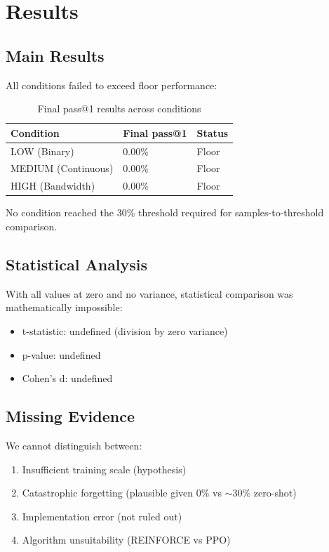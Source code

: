 \section{Results}
\label{sec:results}

\subsection{Main Results}

All conditions failed to exceed floor performance:

\begin{table}[h]
\centering
\caption{Final pass@1 results across conditions}
\label{tab:main_results}
\begin{tabular}{lll}
\toprule
Condition & Final pass@1 & Status \\
\midrule
LOW (Binary) & 0.00\% & Floor \\
MEDIUM (Continuous) & 0.00\% & Floor \\
HIGH (Bandwidth) & 0.00\% & Floor \\
\bottomrule
\end{tabular}
\end{table}

No condition reached the 30\% threshold required for samples-to-threshold comparison.

\subsection{Statistical Analysis}

With all values at zero and no variance, statistical comparison was mathematically impossible:
\begin{itemize}
    \item t-statistic: undefined (division by zero variance)
    \item p-value: undefined
    \item Cohen's d: undefined
\end{itemize}

\subsection{Missing Evidence}

We cannot distinguish between:
\begin{enumerate}
    \item Insufficient training scale (hypothesis)
    \item Catastrophic forgetting (plausible given 0\% vs $\sim$30\% zero-shot)
    \item Implementation error (not ruled out)
    \item Algorithm unsuitability (REINFORCE vs PPO)
\end{enumerate}
